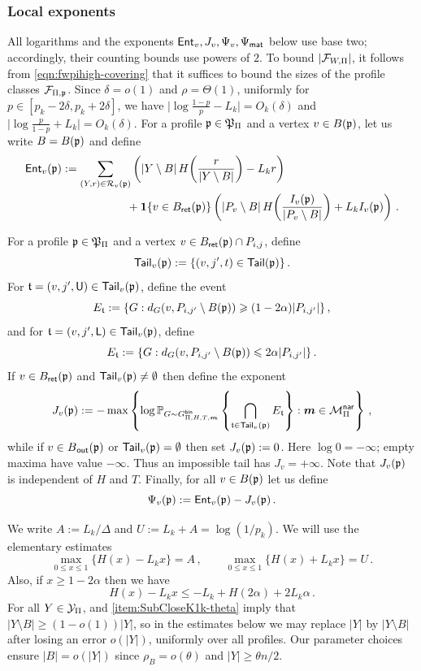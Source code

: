 \subsubsection{Local exponents}\label{subsec:local-exponents-K1k}
All logarithms and the exponents ${\mathsf{Ent}}_v,J_v,\Psi_v,\Psi_{\mathsf{mat}}$ below use base two; accordingly, their counting bounds use powers of $2$. To bound $|{\mathcal F}_{W,\Pi}|$, it follows from \eqref{eqn:fwpihigh-covering} that it suffices to bound the sizes of the profile classes ${\mathcal F}_{\Pi,{\mathfrak p}}$. Since $\delta=o(1)$ and $\rho=\Theta(1)$, uniformly for $p\in[p_k-2\delta,p_k+2\delta]$, we have $\big|\!\log\frac{1-p}{p}-L_k\big|=O_k(\delta)$ and $\big|\!\log\frac{p}{1-p}+L_k\big|=O_k(\delta)$.
For a profile ${\mathfrak p}\in{\mathfrak P}_\Pi$ and a vertex $v\in B({\mathfrak p})$, let us write $B=B({\mathfrak p})$ and define
\begin{align*}
{\ensuremath\mathsf{Ent}}_v({\mathfrak p}) &:= \sum_{(Y,r)\in{\mathcal R}_v({\mathfrak p})}\left(|Y\setminus B|\,H\!\left(\frac{r}{|Y\setminus B|}\right)-L_kr\right)\\
&\hspace{2cm}+\boldsymbol{1}\{v\in B_{\mathsf{ret}}({\mathfrak p})\}\left(|P_v\setminus B|\,H\!\left(\frac{I_v({\mathfrak p})}{|P_v\setminus B|}\right)+L_kI_v({\mathfrak p})\right)\,.
\end{align*}

For a profile ${\mathfrak p}\in{\mathfrak P}_\Pi$ and a vertex $v\in B_{\mathsf{ret}}({\mathfrak p})\cap P_{i,j}$, define
$${\mathsf{Tail}}_v({\mathfrak p}):=\{(v,j',t)\in{\ensuremath\mathsf{Tail}}({\mathfrak p})\}\,.$$
For ${\mathfrak t}=(v,j',{\mathsf{U}})\in{\ensuremath\mathsf{Tail}}_v({\mathfrak p})$, define the event
$$E_{\mathfrak t}:=\{G:d_G(v,P_{i,j'}\setminus B({\mathfrak p}))\geqslant(1-2\alpha)|P_{i,j'}|\}\,,$$
and for ${\mathfrak t}=(v,j',{\mathsf{L}})\in{\ensuremath\mathsf{Tail}}_v({\mathfrak p})$, define
$$E_{\mathfrak t}:=\{G:d_G(v,P_{i,j'}\setminus B({\mathfrak p}))\leqslant2\alpha|P_{i,j'}|\}\,.$$
If $v\in B_{\mathsf{ret}}({\mathfrak p})$ and ${\mathsf{Tail}}_v({\mathfrak p})\neq\emptyset$ then define the exponent
$$J_v({\mathfrak p}):=-\max\left\{\log{\mathbb P}_{G\sim G^{\mathsf{bin}}_{\Pi,H,T,\boldsymbol{m}}}\left\{\bigcap_{{\mathfrak t}\in{\ensuremath\mathsf{Tail}}_v({\mathfrak p})}E_{\mathfrak t}\right\}:\boldsymbol{m}\in{\mathcal M}^{\mathsf{nar}}_\Pi\right\}\,,$$
while if $v\in B_{\hspace{0.2mm}\mathsf{out}}({\mathfrak p})$ or ${\mathsf{Tail}}_v({\mathfrak p})=\emptyset$ then set $J_v({\mathfrak p}):=0$. Here $\log0=-\infty$; empty maxima have value $-\infty$. Thus an impossible tail has $J_v=+\infty$. Note that $J_v({\mathfrak p})$ is independent of $H$ and $T$. Finally, for all $v\in B({\mathfrak p})$ let us define
$$\Psi_v({\mathfrak p}):={\mathsf{Ent}}_v({\mathfrak p})-J_v({\mathfrak p})\,.$$

We write $A:=L_k/\Delta$ and $U:=L_k+A=\log(1/p_k)$. We will use the elementary estimates
\begin{equation}\label{eqn:local-ent-estimates-K1k}
\max_{0\leq x\leq1}\{H(x)-L_kx\}=A\,,\qquad \max_{0\leq x\leq1}\{H(x)+L_kx\}=U\,.
\end{equation}
Also, if $x\geq1-2\alpha$ then we have
\begin{equation}\label{eqn:high-row-ent-K1k}
H(x)-L_kx\leq -L_k+H(2\alpha)+2L_k\alpha\,.
\end{equation}
For all $Y\in{\mathcal Y}_\Pi$,  and  \ref{item:SubCloseK1k-theta} imply that $|Y\setminus B|\geq(1-o(1))|Y|$, so in the estimates below we may replace $|Y|$ by $|Y\setminus B|$ after losing an error $o(|Y|)$, uniformly over all profiles. Our parameter choices ensure $|B|=o(|Y|)$ since $\rho_B=o(\theta)$ and $|Y|\geq\theta n/2$.

